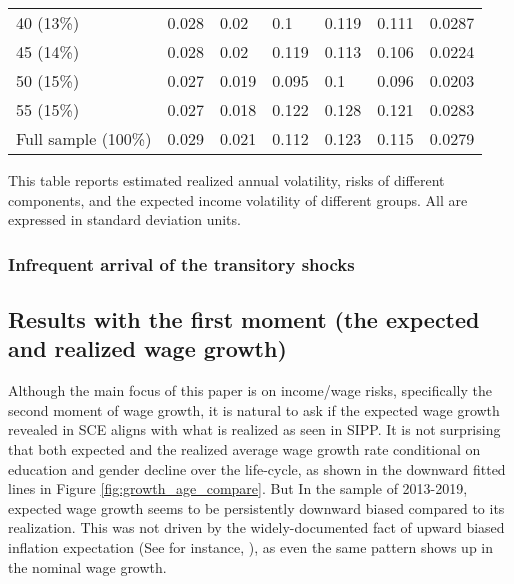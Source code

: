 \begin{table}
{\begin{tabular}{lllllll}
40 (13\%)              & 0.028      & 0.02       & 0.1                & 0.119        & 0.111 & 0.0287 \\
45 (14\%)              & 0.028      & 0.02       & 0.119              & 0.113        & 0.106 & 0.0224 \\
50 (15\%)              & 0.027      & 0.019      & 0.095              & 0.1          & 0.096 & 0.0203 \\
55 (15\%)              & 0.027      & 0.018      & 0.122              & 0.128        & 0.121 & 0.0283 \\
\hline 
Full sample (100\%)          & 0.029      & 0.021      & 0.112              & 0.123        & 0.115 & 0.0279 \\
\hline \hline 
\end{tabular}

}
	\begin{flushleft} This table reports estimated realized annual volatility, risks of different components, and the expected income volatility of different groups. All are expressed in standard deviation units.\end{flushleft}
\end{table}


\subsubsection{Infrequent arrival of the transitory shocks}

\subsection{Results with the first moment (the expected and realized wage growth)}

Although the main focus of this paper is on income/wage risks, specifically the second moment of wage growth, it is natural to ask if the expected wage growth revealed in SCE aligns with what is realized as seen in SIPP. It is not surprising that both expected and the realized average wage growth rate conditional on education and gender decline over the life-cycle, as shown in the downward fitted lines in Figure \ref{fig:growth_age_compare}. But In the sample of 2013-2019, expected wage growth seems to be persistently downward biased compared to its realization. This was not driven by the widely-documented fact of upward biased inflation expectation (See for instance, \cite{wang2021infvar}), as even the same pattern shows up in the nominal wage growth.

